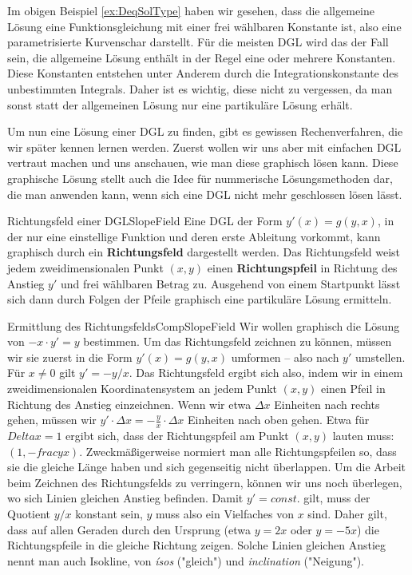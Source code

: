 Im obigen Beispiel \ref{ex:DeqSolType} haben wir gesehen, dass die allgemeine Lösung eine Funktionsgleichung mit einer frei wählbaren Konstante ist, also eine parametrisierte Kurvenschar darstellt. Für die meisten DGL wird das der Fall sein, die allgemeine Lösung enthält in der Regel eine oder mehrere Konstanten. Diese Konstanten entstehen unter Anderem durch die Integrationskonstante des unbestimmten Integrals. Daher ist es wichtig, diese nicht zu vergessen, da man sonst statt der allgemeinen Lösung nur eine partikuläre Lösung erhält.

Um nun eine Lösung einer DGL zu finden, gibt es gewissen Rechenverfahren, die wir später kennen lernen werden. Zuerst wollen wir uns aber mit einfachen DGL vertraut machen und uns anschauen, wie man diese graphisch lösen kann. Diese graphische Lösung stellt auch die Idee für nummerische Lösungsmethoden dar, die man anwenden kann, wenn sich eine DGL nicht mehr geschlossen lösen lässt.

\begin{definition}{Richtungsfeld einer DGL}{SlopeField}
    Eine DGL der Form $y'(x) = g(y,x)$, in der nur eine einstellige Funktion und deren erste Ableitung vorkommt, kann graphisch durch ein \textbf{Richtungsfeld} dargestellt werden. Das Richtungsfeld weist jedem zweidimensionalen Punkt $(x,y)$ einen \textbf{Richtungspfeil} in Richtung des Anstieg $y'$ und frei wählbaren Betrag zu. Ausgehend von einem Startpunkt lässt sich dann durch Folgen der Pfeile graphisch eine partikuläre Lösung ermitteln.
\end{definition}

\begin{example}{Ermittlung des Richtungsfelds}{CompSlopeField}
    Wir wollen graphisch die Lösung von $-x \cdot y'=y$ bestimmen. Um das Richtungsfeld zeichnen zu können, müssen wir sie zuerst in die Form $y'(x) = g(y,x)$ umformen -- also nach $y'$ umstellen. Für $x \ne 0$ gilt $y' = -y/x$. Das Richtungsfeld ergibt sich also, indem wir in einem zweidimensionalen Koordinatensystem an jedem Punkt $(x,y)$ einen Pfeil in Richtung des Anstieg einzeichnen. Wenn wir etwa $\Delta x$ Einheiten nach rechts gehen, müssen wir $y' \cdot \Delta x = -\frac{y}{x} \cdot \Delta x$ Einheiten nach oben gehen. Etwa für $Delta x = 1$ ergibt sich, dass der Richtungspfeil am Punkt $(x,y)$ lauten muss: $(1,-frac{y}{x})$. Zweckmäßigerweise normiert man alle Richtungspfeilen so, dass sie die gleiche Länge haben und sich gegenseitig nicht überlappen.
    Um die Arbeit beim Zeichnen des Richtungsfelds zu verringern, können wir uns noch überlegen, wo sich Linien gleichen Anstieg befinden. Damit $y'=const.$ gilt, muss der Quotient $y/x$ konstant sein, $y$ muss also ein Vielfaches von $x$ sind. Daher gilt, dass auf allen Geraden durch den Ursprung (etwa $y=2x$ oder $y=-5x$) die Richtungspfeile in die gleiche Richtung zeigen. Solche Linien gleichen Anstieg nennt man auch Isokline, von \emph{ísos} ("gleich") und \emph{inclination} ("Neigung").
\end{example}

